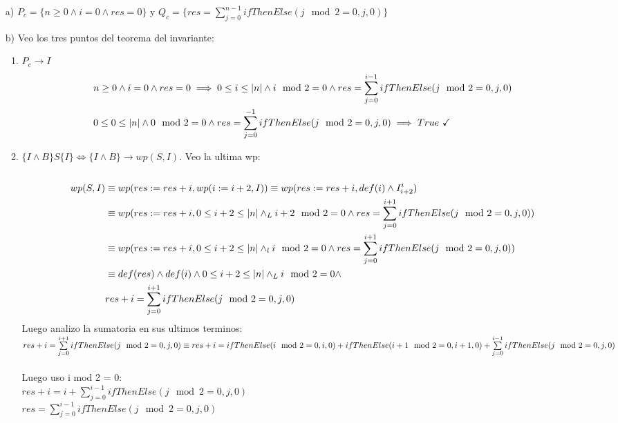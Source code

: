 \documentclass{article}
\begin{document}
\begin{itemize}
    \item [a) ] $P_c=\{n\geq0 \land i=0 \land res=0\}$ y $Q_c=\{res= \sum\limits_{j=0}^{n-1}ifThenElse(j\mod 2=0,j,0)\}$
    \newpage\item [b) ] Veo los tres puntos del teorema del invariante:\\
    \begin{enumerate}
        \item $P_c \to I$\\
        \cont\begin{align}
            &n\geq0 \land i=0 \land res=0 \implies \enRangoInc{i}{n} \land i \mod 2=0 \land res= \sum\limits_{j=0}^{i-1}ifThenElse(j\mod 2=0,j,0)\\
            &\enRangoInc{0}{n} \land 0 \mod 2=0 \land res= \sum\limits_{j=0}^{-1}ifThenElse(j\mod 2=0,j,0) \implies True\ \checkmark
        \end{align}
        \item $\{I\land B\}S\{I\}\Longleftrightarrow \{I\land B\}\to wp(S,I)$. Veo la ultima wp:\\\\
        \cont\begin{align}
            wp(S,I)&\equiv wp(res:=res+i,wp(i:=i+2,I)) \equiv wp(res:=res+i,def(i)\land I^{i}_{i+2})\\
            &\equiv wp(res:=res+i, 0\leq i+2 \leq|n| \land_L i+2 \mod 2=0 \land res= \sum\limits_{j=0}^{i+1}ifThenElse(j\mod 2=0,j,0))\\
            &\equiv wp(res:=res+i,0\leq i+2 \leq|n| \land_l i \mod 2=0 \land res= \sum\limits_{j=0}^{i+1}ifThenElse(j\mod 2=0,j,0))\\
            &\equiv def(res)\land def(i)\land 0\leq i+2 \leq|n| \land_L i \mod 2=0 \land\\\nonumber &res+i= \sum\limits_{j=0}^{i+1}ifThenElse(j\mod 2=0,j,0)
        \end{align}
        Luego analizo la sumatoria en sus ultimos terminos:\\

            $res+i= \sum\limits_{j=0}^{i+1}ifThenElse(j\mod 2=0,j,0)\equiv\\
            res+i=ifThenElse(i\mod 2=0,i,0)+ifThenElse(i+1\mod 2=0,i+1,0)+ \sum\limits_{j=0}^{i-1}ifThenElse(j\mod 2=0,j,0)$\\\\
            Luego uso i mod 2 = 0:\\
            $res+i=i+ \sum\limits_{j=0}^{i-1}ifThenElse(j\mod 2=0,j,0)$\\
            $res=\sum\limits_{j=0}^{i-1}ifThenElse(j\mod 2=0,j,0)$\\\\


\end{enumerate}
\end{itemize}
\end{document}
